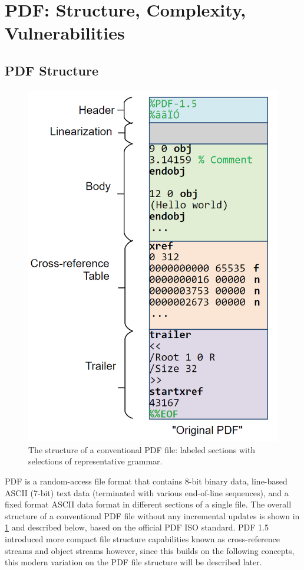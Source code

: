 \section{PDF: Structure, Complexity, Vulnerabilities}
\label{sec:pdf}

\subsection{PDF Structure}
\label{sec:pdfstructure}

\begin{figure}[t]
    \centering
    \includegraphics[width=0.65\linewidth]{figures/pdf-structure.png}
    \caption{The structure of a conventional PDF file: labeled sections with selections of representative grammar.}
    \label{fig:pdf-structure}
\end{figure}

PDF is a random-access file format that contains 8-bit binary data, line-based ASCII (7-bit)
text data (terminated with various end-of-line sequences), and a fixed format ASCII 
data format in different sections of a single file. The overall structure of a 
conventional PDF file without any incremental updates is shown in \cref{fig:pdf-structure} and 
described below, based on the official PDF ISO standard.
PDF 1.5 introduced more compact file structure capabilities known as cross-reference streams 
and object streams however, since this builds on the following concepts, this modern 
variation on the PDF file structure will be described later.

